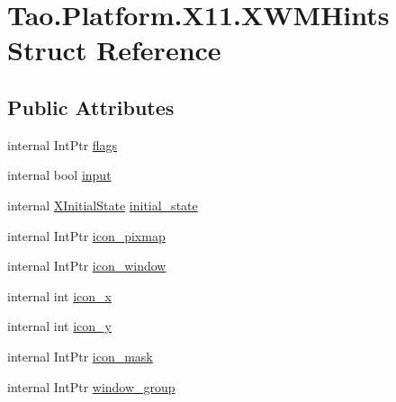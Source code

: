 \hypertarget{struct_tao_1_1_platform_1_1_x11_1_1_x_w_m_hints}{
\section{Tao.Platform.X11.XWMHints Struct Reference}
\label{struct_tao_1_1_platform_1_1_x11_1_1_x_w_m_hints}
}
\subsection*{Public Attributes}
\begin{DoxyCompactItemize}
\item 
internal IntPtr \hyperlink{struct_tao_1_1_platform_1_1_x11_1_1_x_w_m_hints_a7ab2f00af67ddc934a45ad492d049ae4}{flags}
\item 
internal bool \hyperlink{struct_tao_1_1_platform_1_1_x11_1_1_x_w_m_hints_a1fd34eaf44522ebdf78e696a37c93d35}{input}
\item 
internal \hyperlink{namespace_tao_1_1_platform_1_1_x11_afd39ddeddb2fb29b5635976dbe8b8a88}{XInitialState} \hyperlink{struct_tao_1_1_platform_1_1_x11_1_1_x_w_m_hints_aef8ce6dc28f961ad11447ab8cbc5a9a6}{initial\_\-state}
\item 
internal IntPtr \hyperlink{struct_tao_1_1_platform_1_1_x11_1_1_x_w_m_hints_a988cf463103d329b07367398e8112118}{icon\_\-pixmap}
\item 
internal IntPtr \hyperlink{struct_tao_1_1_platform_1_1_x11_1_1_x_w_m_hints_ab78d9e8bc6658270fe5ad78c2e587c5d}{icon\_\-window}
\item 
internal int \hyperlink{struct_tao_1_1_platform_1_1_x11_1_1_x_w_m_hints_aebc70b641bb625e5587285f9bd094df5}{icon\_\-x}
\item 
internal int \hyperlink{struct_tao_1_1_platform_1_1_x11_1_1_x_w_m_hints_af7d7bcef4ece239cd46e858e34e9b0e5}{icon\_\-y}
\item 
internal IntPtr \hyperlink{struct_tao_1_1_platform_1_1_x11_1_1_x_w_m_hints_a623047a93d81311d7c7fd61b18937c9f}{icon\_\-mask}
\item 
internal IntPtr \hyperlink{struct_tao_1_1_platform_1_1_x11_1_1_x_w_m_hints_a66a886ae6542fde05c118856c740fa26}{window\_\-group}
\end{DoxyCompactItemize}


